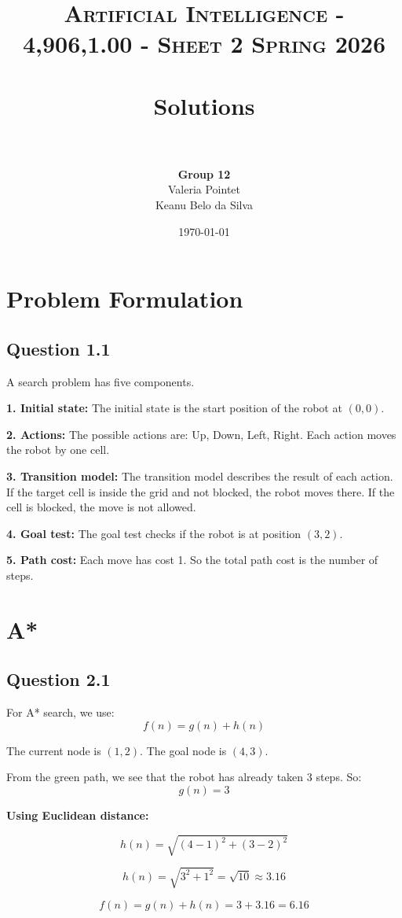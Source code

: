 \documentclass[paper=a4, fontsize=11pt]{scrartcl}
\title{
\normalfont \normalsize
\textsc{Artificial Intelligence - 4,906,1.00 - Sheet 2 Spring 2026} \\[10pt]
\horrule{0.5pt} \\[0.4cm]
\huge Solutions \\[-2pt]
\horrule{2pt} \\[0.5cm]
}
\author{
\textbf{Group 12}\\
Valeria Pointet\\
Keanu Belo da Silva
}
\date{\normalsize\today}
\begin{document}
\maketitle

\section{Problem Formulation}

\subsection*{Question 1.1}
A search problem has five components.

\textbf{1. Initial state:}  
The initial state is the start position of the robot at $(0,0)$.

\textbf{2. Actions:}  
The possible actions are: Up, Down, Left, Right.  
Each action moves the robot by one cell.

\textbf{3. Transition model:}  
The transition model describes the result of each action.  
If the target cell is inside the grid and not blocked, the robot moves there.  
If the cell is blocked, the move is not allowed.

\textbf{4. Goal test:}  
The goal test checks if the robot is at position $(3,2)$.

\textbf{5. Path cost:}  
Each move has cost 1.  
So the total path cost is the number of steps.

\section{A*}

\subsection*{Question 2.1}
For A* search, we use:
\[
f(n) = g(n) + h(n)
\]

The current node is $(1,2)$.  
The goal node is $(4,3)$.

From the green path, we see that the robot has already taken 3 steps.  
So:
\[
g(n) = 3
\]

\textbf{Using Euclidean distance:}

\[
h(n) = \sqrt{(4-1)^2 + (3-2)^2}
\]

\[
h(n) = \sqrt{3^2 + 1^2} = \sqrt{10} \approx 3.16
\]

\[
f(n) = g(n) + h(n) = 3 + 3.16 = 6.16
\]
\end{document}
